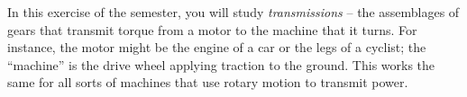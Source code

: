 \documentclass[12pt]{article}
\newcommand{\EI}{\end{itemize}}
\begin{document}
%
%
%


\Large
\centerline{}
\normalsize
\centerline{}

In this exercise of the semester, you will study {\it transmissions} -- the assemblages of gears that transmit torque from a motor to the machine that it turns. For instance, the motor might be the engine of a car or the legs of a cyclist; the ``machine'' is the drive wheel applying traction to the ground. This works the same for all sorts of machines that use rotary motion to transmit power.
\end{document}
